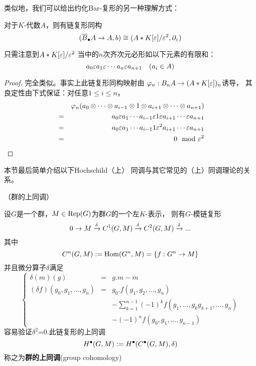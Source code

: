 类似地，我们可以给出约化Bar-复形的另一种理解方式：

\begin{prop}
对于$K$-代数$A$，则有链复形同构
$$(\overline{B}_{\bullet} A\to A,b)\cong (A*K[\varepsilon]/\varepsilon^2,\partial_{\varepsilon})$$
\end{prop}

只需注意到$A*K[\varepsilon]/\varepsilon^2$
当中的$n$次齐次元必形如以下元素的有限和：
$$a_0\varepsilon a_1\varepsilon\cdots a_n\varepsilon a_{n+1}\quad (a_i\in A)$$

\begin{proof}
完全类似。事实上此链复形同构映射由
$\varphi_n:B_nA \to (A*K[\varepsilon])_n$诱导，
其良定性由下式保证：对任意$1\leq i\leq n$，
\begin{eqnarray*}
&&  \varphi_n(a_0\otimes \cdots\otimes a_{i-1}
    \otimes 1\otimes a_{i+1}\otimes\cdots\otimes a_{n+1})\\
&=& a_0\varepsilon a_1\cdots a_{i-1}\varepsilon1\varepsilon a_{i+1}\cdots\varepsilon a_{n+1}\\
&=& a_0\varepsilon a_1\cdots a_{i-1}1\varepsilon^2a_{i+1}\cdots\varepsilon a_{n+1}\\
&=& 0\mod{\varepsilon}^2
\end{eqnarray*}
\end{proof}

本节最后简单介绍以下Hochschild（上）
同调与其它常见的（上）同调理论的关系。

\begin{example}（群的上同调）%

设$G$是一个群，$M\in\operatorname{Rep}(G)$为群$G$的一个左$K$-表示，
则有$G$-模链复形
$$0\to M\xrightarrow{\delta}C^1(G,M)\xrightarrow{\delta}C^2(G,M)\xrightarrow{\delta}...$$
其中%
$$C^n(G,M):=\operatorname{Hom}(G^n,M)=\{f:G^n\to M\}$$
并且微分算子$\delta$满足%
$$\left\{\begin{array}{rcl}
\delta(m)(g)&=&g.m-m\\
(\delta f)(g_0,g_1,...,g_n)&=&
g_0.f(g_1,g_2,...,g_n)\\
&&-\sum\limits_{k=1}^{n-1}(-1)^kf(g_1,...,g_kg_{k+1},...,g_n)\\
&&-(-1)^nf(g_0,g_1,...,g_{n-1})
\end{array}\right.
$$
容易验证$\delta^2$=0.此链复形的上同调
$$H^{\bullet}(G,M):=H^{\bullet}(C^{\bullet}(G,M),\delta)$$
称之为\textbf{群的上同调}(group cohomology)
\end{example}

